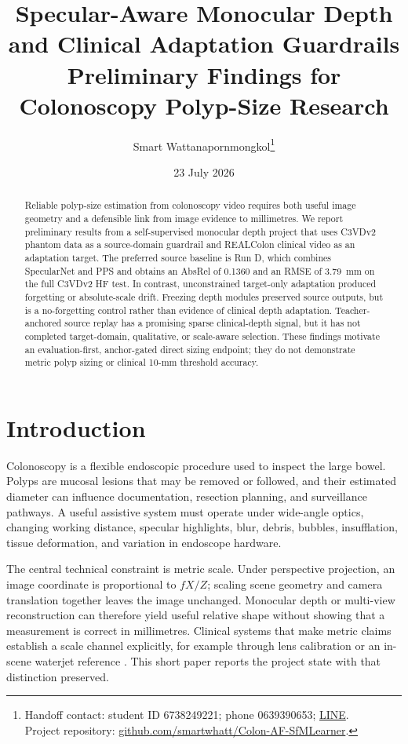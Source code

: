 \documentclass[11pt]{article}
\title{Specular-Aware Monocular Depth and Clinical Adaptation Guardrails\\
\large Preliminary Findings for Colonoscopy Polyp-Size Research}
\author{Smart Wattanapornmongkol\thanks{\raggedright Handoff contact: student ID 6738249221; phone 0639390653; \href{https://line.me/ti/p/nqlvyY38hD}{LINE}.\\Project repository: \href{https://github.com/smartwhatt/Colon-AF-SfMLearner}{github.com/smartwhatt/Colon-AF-SfMLearner}.}}
\date{23 July 2026}
\begin{document}
\maketitle

\begin{abstract}
Reliable polyp-size estimation from colonoscopy video requires both useful
image geometry and a defensible link from image evidence to millimetres. We
report preliminary results from a self-supervised monocular depth project that
uses C3VDv2 phantom data as a source-domain guardrail and REALColon clinical
video as an adaptation target. The preferred source baseline is Run D, which
combines SpecularNet and PPS and obtains an AbsRel of 0.1360 and an RMSE of
3.79~mm on the full C3VDv2 HF test. In contrast, unconstrained target-only
adaptation produced forgetting or absolute-scale drift. Freezing depth modules
preserved source outputs, but is a no-forgetting control rather than evidence
of clinical depth adaptation. Teacher-anchored source replay has a promising
sparse clinical-depth signal, but it has not completed target-domain,
qualitative, or scale-aware selection. These findings motivate an
evaluation-first, anchor-gated direct sizing endpoint; they do not demonstrate
metric polyp sizing or clinical 10-mm threshold accuracy.
\end{abstract}

\section{Introduction}

Colonoscopy is a flexible endoscopic procedure used to inspect the large
bowel. Polyps are mucosal lesions that may be removed or followed, and their
estimated diameter can influence documentation, resection planning, and
surveillance pathways. A useful assistive system must operate under wide-angle
optics, changing working distance, specular highlights, blur, debris, bubbles,
insufflation, tissue deformation, and variation in endoscope hardware.

The central technical constraint is metric scale. Under perspective projection,
an image coordinate is proportional to $fX/Z$; scaling scene geometry and
camera translation together leaves the image unchanged. Monocular depth or
multi-view reconstruction can therefore yield useful relative shape without
showing that a measurement is correct in millimetres. Clinical systems that
make metric claims establish a scale channel explicitly, for example through
lens calibration \cite{wang2024endoangel} or an in-scene waterjet reference
\cite{sudarevic2023poseidon}. This short paper reports the project state with
that distinction preserved.
\end{document}
